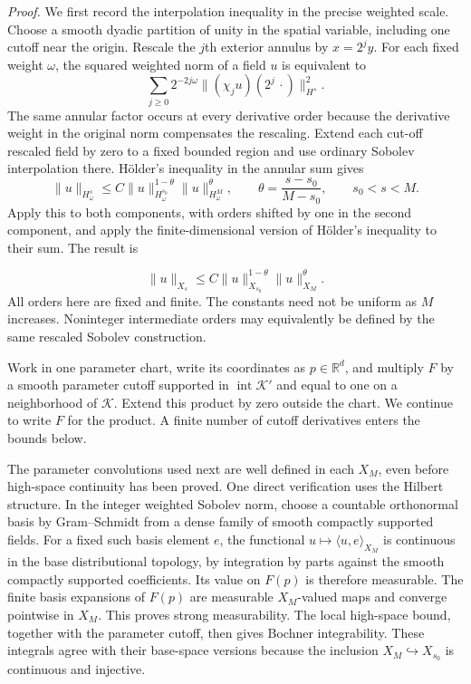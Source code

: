 \documentclass[
  english,
  11pt,
  reqno]{amsart}
\begin{document}
\emph{Proof.} We first record the interpolation inequality in the
precise weighted scale. Choose a smooth dyadic partition of unity in the
spatial variable, including one cutoff near the origin. Rescale the
\(j\)th exterior annulus by \(x=2^jy\). For each fixed weight
\(\omega\), the squared weighted norm of a field \(u\) is equivalent to
\[
\sum_{j\ge0}2^{-2j\omega}
  \bigl\|(\chi_j u)(2^j\,\cdot)\bigr\|_{H^s}^2.
\] The same annular factor occurs at every derivative order because the
derivative weight in the original norm compensates the rescaling. Extend
each cut-off rescaled field by zero to a fixed bounded region and use
ordinary Sobolev interpolation there. Hölder's inequality in the annular
sum gives \[
\|u\|_{H^s_\omega}
 \le C\|u\|_{H^{s_0}_\omega}^{1-\theta}
          \|u\|_{H^M_\omega}^{\theta},
\qquad
\theta=\frac{s-s_0}{M-s_0},\qquad s_0<s<M.
\] Apply this to both components, with orders shifted by one in the
second component, and apply the finite-dimensional version of Hölder's
inequality to their sum. The result is

\label{eq:online-parameter-weighted-interpolation} \[
\|u\|_{X_s}
 \le C\|u\|_{X_{s_0}}^{1-\theta}\|u\|_{X_M}^{\theta}.
\] All orders here are fixed and finite. The constants need not be
uniform as \(M\) increases. Noninteger intermediate orders may
equivalently be defined by the same rescaled Sobolev construction.

Work in one parameter chart, write its coordinates as
\(p\in\mathbb R^d\), and multiply \(F\) by a smooth parameter cutoff
supported in \(\operatorname{int}\mathcal K'\) and equal to one on a
neighborhood of \(\mathcal K\). Extend this product by zero outside the
chart. We continue to write \(F\) for the product. A finite number of
cutoff derivatives enters the bounds below.

The parameter convolutions used next are well defined in each \(X_M\),
even before high-space continuity has been proved. One direct
verification uses the Hilbert structure. In the integer weighted Sobolev
norm, choose a countable orthonormal basis by Gram--Schmidt from a dense
family of smooth compactly supported fields. For a fixed such basis
element \(e\), the functional \(u\mapsto\langle u,e\rangle_{X_M}\) is
continuous in the base distributional topology, by integration by parts
against the smooth compactly supported coefficients. Its value on
\(F(p)\) is therefore measurable. The finite basis expansions of
\(F(p)\) are measurable \(X_M\)-valued maps and converge pointwise in
\(X_M\). This proves strong measurability. The local high-space bound,
together with the parameter cutoff, then gives Bochner integrability.
These integrals agree with their base-space versions because the
inclusion \(X_M\hookrightarrow X_{s_0}\) is continuous and injective.
\end{document}
